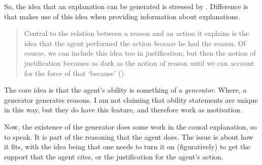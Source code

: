 \documentclass[10pt]{article}
\begin{document}
\begin{note}[Davidson]
  So, the idea that an explanation can be generated is stressed by \citeauthor{Davidson:2001aa}.
  Difference is that \citeauthor{Davidson:2001aa} makes use of this idea when providing information about explanations.



  \begin{quote}
    Central to the relation between a reason and an action it explains is the idea that the agent performed the action \emph{because} he had the reason.
    Of course, we can include this idea too in justification; but then the notion of justification becomes as dark as the notion of reason until we can account for the force of that ‘because’\nolinebreak
    \mbox{}\hfill(\citeyear[9]{Davidson:2001aa})
  \end{quote}
\end{note}

\begin{note}[Generator]
  The core idea is that the agent's ability is something of a \emph{generator}.
  Where, a generator generates reasons.
  I am not claiming that ability statements are unique in this way, but they do have this feature, and therefore work as motivation.

  Now, the existence of the generator does some work in the causal explanation, so to speak.
  It is part of the reasoning that the agent does.
  The issue is about how it fits, with the idea being that one needs to turn it on (figuratively) to get the support that the agent cites, or the justification for the agent's action.
\end{note}
\end{document}
